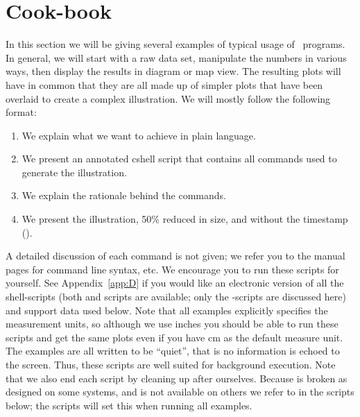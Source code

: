 %
%
\chapter{Cook-book}
\label{ch:7}
\thispagestyle{headings}

In this section we will be giving several examples of
typical usage of \GMT\ programs.  In general, we will
start with a raw data set, manipulate the numbers in
various ways, then display the results in diagram or
map view.  The resulting plots will have in common that
they are all made up of simpler plots that have been
overlaid to create a complex illustration.  We will
mostly follow the following format:

\begin{enumerate}
\item We explain what we want to achieve in plain
language.

\item We present an annotated cshell script that contains
all commands used to generate the illustration.

\item We explain the rationale behind the commands.

\item We present the illustration, 50\% reduced in size, and without
the timestamp ().
\end{enumerate}

A detailed discussion of each command is not given;
we refer you to the manual pages for command line
syntax, etc.  We encourage you to run these scripts for yourself.
See Appendix~\ref{app:D} if you would like an electronic version
of all the shell-scripts (both  and  scripts
are available; only the -scripts are discussed here) and support
data used below.  Note that all examples explicitly specifies the
measurement units, so although we use inches you should be able
to run these scripts and get the same plots even if you have cm
as the default measure unit.  The examples are all written to be ``quiet'',
that is no information is echoed to the screen.  Thus,
these scripts are well suited for background execution.
Note that we also end each script by cleaning up after
ourselves. Because  is broken as designed on some
systems, and  is not available on others we refer
to  in the scripts below; the 
scripts will set this when running all examples. 

